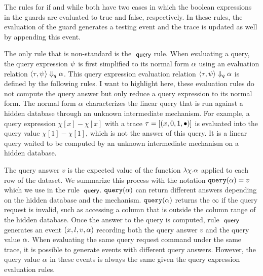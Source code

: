 The rules for if and while both have two cases 
in which the boolean expressions in the guards are evaluated to true and false, respectively. 
In these rules, the evaluation of the guard generates a testing event and the trace is updated as well by appending this event.

The only rule that is non-standard is the $\textsf{\small{ query}}$ rule. When evaluating a query, the query expression $\psi$ is first simplified to its normal form $\alpha$ using an evaluation relation 
$\langle \mathtt{\tau}, \psi \rangle \Downarrow_q \alpha$. 
This query expression evaluation relation $\langle \mathtt{\tau}, \psi \rangle \Downarrow_q \alpha$ is defined by the following rules.
I want to highlight here, these evaluation rules do not compute the query answer but only reduce a query expression to its normal form.
The normal form $\alpha$ characterizes the linear query that is run against a hidden database through an unknown intermediate mechanism.
For example, a query expression $\chi[x] - \chi[x]$ with a trace $\mathtt{\tau} = [(x, 0, 1, \bullet)]$
is evaluated into the query value $\chi[1] - \chi[1]$, which is not the answer of this query.
It is a linear query waited to be computed by an unknown intermediate mechanism on a hidden database.
{\small
{}
 }

The query answer $v$ is the expected value of the function $\lambda \chi.\alpha$ applied to each row of the dataset. 
We summarize this process with the notation ${\tt query}(\alpha) = v$ which we use in the rule $\textsf{\small{ query}}$. 
${\tt query}(\alpha) $ can return different answers depending on the hidden database and the mechanism.
${\tt query}(\alpha)$ returns the $\infty$ if the query request is invalid, such as accessing a column that is outside the column range of the hidden database.
Once the answer to the query is computed, rule $\textsf{\small{ query}}$ generates an event
$(x, l, v, \alpha)$ recording
both the query answer $v$ and the query value $\alpha$.
When evaluating the same query request command under the same trace, it is possible to generate
events with different query answers. However, the query value $\alpha$ in these events is always the same
given the query expression evaluation rules.

